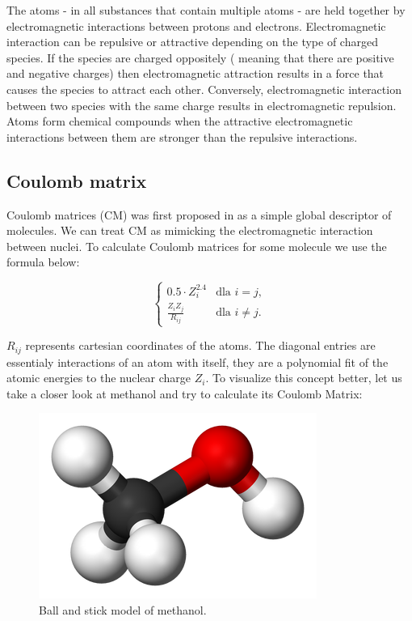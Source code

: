 \documentclass[a4paper,oneside,openright,11pt]{book}
\begin{document}
The atoms - in all substances that contain multiple atoms - are held together by electromagnetic interactions between protons and electrons. Electromagnetic interaction can be repulsive or attractive depending on the type of charged species. If the species are charged oppositely ( meaning that there are positive and negative charges) then electromagnetic attraction results in a force that causes the species to attract each other. Conversely, electromagnetic interaction between two species with the same charge results in electromagnetic repulsion. Atoms form chemical compounds when the attractive electromagnetic interactions between them are stronger than the repulsive interactions.


\subsection{Coulomb matrix}

Coulomb matrices (CM) was first proposed in \cite{rupp} as a simple global descriptor of molecules. We can treat CM as mimicking the electromagnetic interaction between nuclei. To calculate Coulomb matrices for some molecule we use the formula below:

\begin{equation}
\begin{cases} 
0.5 \cdot Z_{i}^{2.4} & \text{dla } i = j, \\

\frac{Z_{i} Z_{j}}{R_{ij}}  & \text{dla } i \neq j. 
\end{cases}
\end{equation}

$R_{ij}$ represents cartesian coordinates of the atoms.
The diagonal entries are essentialy interactions of an atom with itself, they are a polynomial fit of the atomic energies to the nuclear charge $Z_i$. To visualize this concept better, let us take a closer look at methanol and try to calculate its Coulomb Matrix:

\begin{figure}[h]
\centering
\includegraphics[scale=0.5]{DocumentFigures/Figures/metan.png}
\caption{Ball and stick model of methanol.\cite{CMy}}
\end{figure}
\end{document}
